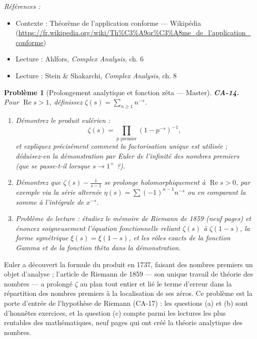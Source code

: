 \documentclass[11pt]{article}
\newtheorem{problem}{Problème}
\newenvironment{refs}{\par\small\noindent\emph{Références :}\begin{itemize}\setlength\itemsep{0pt}}{\end{itemize}\normalsize}
\begin{document}
\begin{refs}
\item Contexte : Théorème de l'application conforme --- Wikipédia (\url{https://fr.wikipedia.org/wiki/Th%C3%A9or%C3%A8me_de_l'application_conforme})
\item Lecture : Ahlfors, \textit{Complex Analysis}, ch. 6
\item Lecture : Stein \& Shakarchi, \textit{Complex Analysis}, ch. 8
\end{refs}

\bigskip

\begin{problem}[{Prolongement analytique et fonction zêta --- Master}]
\textbf{CA-14.} Pour $ \operatorname{Re} s > 1 $, définissez
$ \zeta(s) = \sum_{n \ge 1} n^{-s} $.
\begin{enumerate}
\item[(a)] Démontrez le produit eulérien :
\[ \zeta(s) = \prod_{p \text{ premier}} \left(1 - p^{-s}\right)^{-1}, \]
et expliquez précisément comment la factorisation unique est utilisée ; déduisez-en la démonstration
par Euler de l'infinité des nombres premiers (que se passe-t-il lorsque $ s \to 1^+ $ ?).
\item[(b)] Démontrez que
$ \zeta(s) - \frac{1}{s - 1} $ se prolonge holomorphiquement à $ \operatorname{Re} s > 0 $,
par exemple via la série alternée $ \eta(s) = \sum (-1)^{n-1} n^{-s} $ ou en comparant la somme à
l'intégrale de $ x^{-s} $.
\item[(c)] Problème de lecture : étudiez le mémoire de Riemann de 1859
(neuf pages) et énoncez soigneusement l'équation fonctionnelle reliant $ \zeta(s) $ à
$ \zeta(1 - s) $, la forme symétrique $ \xi(s) = \xi(1 - s) $, et les rôles exacts de la fonction
Gamma et de la fonction thêta dans la démonstration.
\end{enumerate}

\end{problem}

\noindent Euler a découvert la formule du produit en 1737, faisant des nombres premiers un
objet d'analyse ; l'article de Riemann de 1859 --- son unique travail de théorie des nombres --- a
prolongé $\zeta$ au plan tout entier et lié le terme d'erreur dans la répartition des nombres premiers à la
localisation de ses zéros. Ce problème est la porte d'entrée de l'hypothèse de Riemann (CA-17) : les
questions (a) et (b) sont d'honnêtes exercices, et la question (c) compte parmi les lectures les
plus rentables des mathématiques, neuf pages qui ont créé la théorie analytique des nombres.
\end{document}
